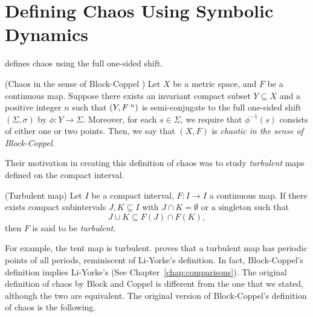 \documentclass[10pt,twoside]{book}
\begin{document}
\section{Defining Chaos Using Symbolic Dynamics}
\citet{blockcoppel} defines chaos using the full one-sided shift.
\begin{definition}
  (Chaos in the sense of Block-Coppel \citep{blockcoppel})
  Let $X$ be a metric space, and $F$ be a continuous map.
  Suppose there exists an invariant compact subset $Y \subseteq X$ and a positive integer $n$ such that $(Y,F^{\;n})$ is semi-conjugate to the full one-sided shift $(\Sigma, \sigma)$ by $\phi: Y \to \Sigma$.
  Moreover, for each $s \in \Sigma$, we require that $\phi^{-1}(s)$ consists of either one or two points.
  Then, we say that $(X,F)$ is \textit{chaotic in the sense of Block-Coppel}.
  \begin{center}
  \end{center}
  \label{defn:blockcoppel}
\end{definition}
Their motivation in creating this definition of chaos was to study \textit{turbulent} maps defined on the compact interval.
\begin{definition}
  (Turbulent map)
  Let $I$ be a compact interval, $F: I \to I$ a continuous map.
  If there exists compact subintervals $J,K \subseteq I$ with $J \cap K = \emptyset \mbox{ or a singleton}$ such that
  \begin{equation*}
    J \cup K \subseteq F(J) \cap F(K),
  \end{equation*}
  then $F$ is said to be \textit{turbulent}.
\end{definition}
For example, the tent map is turbulent.
\citet{blockcoppel} proves that a turbulent map has periodic points of all periods, reminiscent of Li-Yorke's definition.
In fact, Block-Coppel's definition implies Li-Yorke's (See Chapter~\ref{chap:comparisons}).
The original definition of chaos by Block and Coppel is different from the one that we stated, although the two are equivalent.
The original version of Block-Coppel's definition of chaos is the following.
\end{document}
